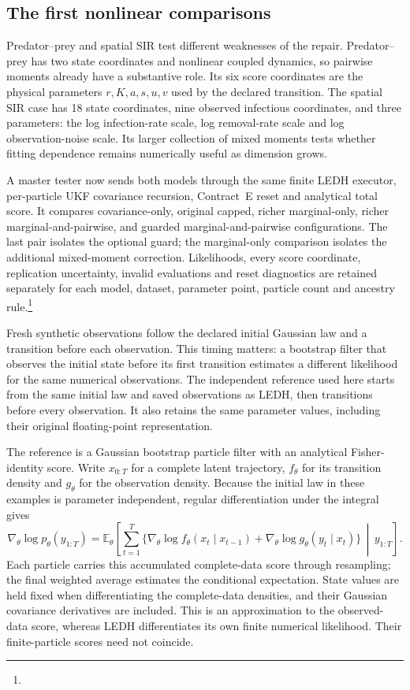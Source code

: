 \subsection{The first nonlinear comparisons}

Predator--prey and spatial SIR test different weaknesses of the repair.
Predator--prey has two state coordinates and nonlinear coupled dynamics, so
pairwise moments already have a substantive role.  Its six score coordinates
are the physical parameters \(r,K,a,s,u,v\) used by the declared transition.
The spatial SIR case has 18 state coordinates, nine observed infectious
coordinates, and three parameters: the log infection-rate scale, log
removal-rate scale and log observation-noise scale.  Its larger collection of
mixed moments tests whether fitting dependence remains numerically useful as
dimension grows.

A master tester now sends both models through the same finite LEDH executor,
per-particle UKF covariance recursion, Contract~E reset and analytical total
score.  It compares covariance-only, original capped, richer marginal-only,
richer marginal-and-pairwise, and guarded marginal-and-pairwise configurations.
The last pair isolates the optional guard; the marginal-only comparison
isolates the additional mixed-moment correction.  Likelihoods, every score
coordinate, replication uncertainty, invalid evaluations and reset diagnostics
are retained separately for each model, dataset, parameter point, particle
count and ancestry rule.\footnote{}

Fresh synthetic observations follow the declared initial Gaussian law and a
transition before each observation.  This timing matters: a bootstrap filter
that observes the initial state before its first transition estimates a
different likelihood for the same numerical observations.  The independent
reference used here starts from the same initial law and saved observations
as LEDH, then transitions before every observation.  It also retains the same
parameter values, including their original floating-point representation.

The reference is a Gaussian bootstrap particle filter with an analytical
Fisher-identity score.  Write \(x_{0:T}\) for a complete latent trajectory,
\(f_\theta\) for its transition density and \(g_\theta\) for the observation
density.  Because the initial law in these examples is parameter independent,
regular differentiation under the integral gives
\[
 \nabla_\theta\log p_\theta(y_{1:T})
 =\mathbb E_\theta\!\left[
   \sum_{t=1}^T\{\nabla_\theta\log f_\theta(x_t\mid x_{t-1})
              +\nabla_\theta\log g_\theta(y_t\mid x_t)\}
       \,\middle|\,y_{1:T}\right].
\]
Each particle carries this accumulated complete-data score through resampling;
the final weighted average estimates the conditional expectation.  State
values are held fixed when differentiating the complete-data densities, and
their Gaussian covariance derivatives are included.  This is an approximation
to the observed-data score, whereas LEDH differentiates its own finite
numerical likelihood.  Their finite-particle scores need not coincide.


